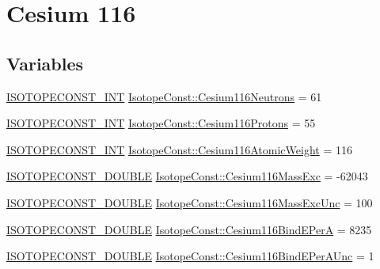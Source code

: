 \hypertarget{group___isotope_const-_cesium-_cs116}{}\section{Cesium 116}
\label{group___isotope_const-_cesium-_cs116}
\subsection*{Variables}
\begin{DoxyCompactItemize}
\item 
\mbox{\hyperlink{group___isotope_const-_macros_ga5f18360b3e99483a35c32d789e62621c}{I\+S\+O\+T\+O\+P\+E\+C\+O\+N\+S\+T\+\_\+\+I\+NT}} \mbox{\hyperlink{group___isotope_const-_cesium-_cs116_ga83307f00494859e53e7b284245c124a0}{Isotope\+Const\+::\+Cesium116\+Neutrons}} = 61
\item 
\mbox{\hyperlink{group___isotope_const-_macros_ga5f18360b3e99483a35c32d789e62621c}{I\+S\+O\+T\+O\+P\+E\+C\+O\+N\+S\+T\+\_\+\+I\+NT}} \mbox{\hyperlink{group___isotope_const-_cesium-_cs116_ga58bfe3a9089ac300508911b91f7a9814}{Isotope\+Const\+::\+Cesium116\+Protons}} = 55
\item 
\mbox{\hyperlink{group___isotope_const-_macros_ga5f18360b3e99483a35c32d789e62621c}{I\+S\+O\+T\+O\+P\+E\+C\+O\+N\+S\+T\+\_\+\+I\+NT}} \mbox{\hyperlink{group___isotope_const-_cesium-_cs116_gad20853c922ad3d8b715bbd5ee8a363e9}{Isotope\+Const\+::\+Cesium116\+Atomic\+Weight}} = 116
\item 
\mbox{\hyperlink{group___isotope_const-_macros_ga8f45a7272ce02c0b4c65c44636ed719a}{I\+S\+O\+T\+O\+P\+E\+C\+O\+N\+S\+T\+\_\+\+D\+O\+U\+B\+LE}} \mbox{\hyperlink{group___isotope_const-_cesium-_cs116_ga4071dd524dd568787c617a063fa92bf8}{Isotope\+Const\+::\+Cesium116\+Mass\+Exc}} = -\/62043
\item 
\mbox{\hyperlink{group___isotope_const-_macros_ga8f45a7272ce02c0b4c65c44636ed719a}{I\+S\+O\+T\+O\+P\+E\+C\+O\+N\+S\+T\+\_\+\+D\+O\+U\+B\+LE}} \mbox{\hyperlink{group___isotope_const-_cesium-_cs116_ga82c8bc9dbb6d74ce92609f2f53aeedb2}{Isotope\+Const\+::\+Cesium116\+Mass\+Exc\+Unc}} = 100
\item 
\mbox{\hyperlink{group___isotope_const-_macros_ga8f45a7272ce02c0b4c65c44636ed719a}{I\+S\+O\+T\+O\+P\+E\+C\+O\+N\+S\+T\+\_\+\+D\+O\+U\+B\+LE}} \mbox{\hyperlink{group___isotope_const-_cesium-_cs116_ga6f1fe6422889ce73debd548b11f6fd00}{Isotope\+Const\+::\+Cesium116\+Bind\+E\+PerA}} = 8235
\item 
\mbox{\hyperlink{group___isotope_const-_macros_ga8f45a7272ce02c0b4c65c44636ed719a}{I\+S\+O\+T\+O\+P\+E\+C\+O\+N\+S\+T\+\_\+\+D\+O\+U\+B\+LE}} \mbox{\hyperlink{group___isotope_const-_cesium-_cs116_gad51e1483009474a35d4fba3184a90849}{Isotope\+Const\+::\+Cesium116\+Bind\+E\+Per\+A\+Unc}} = 1

\end{DoxyCompactItemize}
